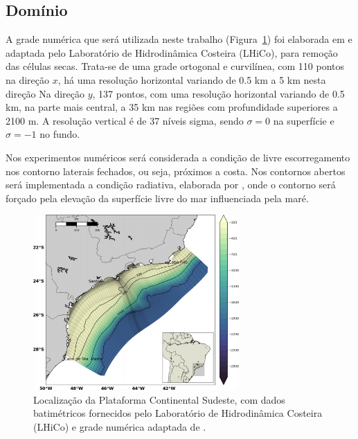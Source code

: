 \subsection{Domínio}
\label{sub:domain}

\hspace{5mm} A grade numérica que será utilizada neste trabalho (Figura~\ref{fig:areaestudo}) foi elaborada
em \cite{pereira2007numerical} e adaptada pelo Laboratório de Hidrodinâmica Costeira (LHiCo), para remoção
das células secas. Trata-se de uma grade ortogonal e curvilínea, com 110 pontos na direção $x$, há
uma resolução horizontal variando de 0.5 km a 5 km nesta direção Na direção $y$, 137 pontos,
com uma resolução horizontal variando de 0.5 km, na parte mais central, a 35 km nas regiões com profundidade
superiores a 2100 m. A resolução vertical é de 37 níveis sigma, sendo $\sigma = 0$ na superfície e $\sigma = -1$
no fundo.

\hspace{5mm} Nos experimentos numéricos será considerada a condição de livre escorregamento
nos contorno laterais fechados, ou seja, próximos a costa. Nos contornos abertos será implementada
a condição radiativa, elaborada por \citep{reid1968numerical}, onde o contorno será forçado
pela elevação da superfície livre do mar influenciada pela maré.


\begin{figure}[!h]
    \centering
    \includegraphics[width=0.7\textwidth]{figuras/grade.png}
\caption[Plataforma Continental Sudeste]{Localização da Plataforma Continental Sudeste, com dados batimétricos fornecidos
pelo Laboratório de Hidrodinâmica Costeira (LHiCo) e grade numérica adaptada de \cite{pereira2007numerical}.}
    \label{fig:areaestudo}
\end{figure}

